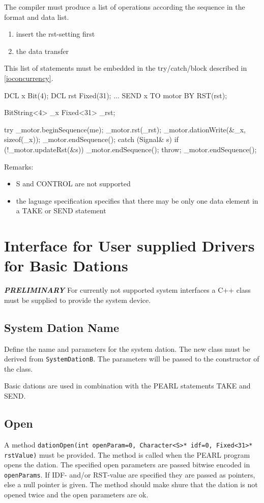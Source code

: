 The compiler must produce a list of operations according the sequence 
in the format and data list.
\begin{enumerate}
\item insert the rst-setting first
\item the data transfer 
\end{enumerate}
This list of statements must be embedded in the try/catch/block described in
\ref{ioconcurrency}.

\begin{PEARLCode}
DCL x Bit(4);
DCL rst Fixed(31);
...
SEND x TO motor BY RST(rst);
\end{PEARLCode}

\begin{CppCode}
BitString<4> _x
Fixed<31> _rst;

try {
   _motor.beginSequence(me);
   _motor.rst(_rst);
   _motor.dationWrite(&_x, sizeof(_x));
   _motor.endSequence();
} catch (Signal& s) {
   if (!_motor.updateRst(&s)) {
      _motor.endSequence();
      throw;
   }
   _motor.endSequence();
}
\end{CppCode}


Remarks:
\begin{itemize}
\item S and CONTROL are not supported
\item the laguage specification specifies that there
   may be only one data element in a TAKE or SEND statement
\end{itemize}

\section{Interface for User supplied Drivers for Basic Dations}
{\bf \it PRELIMINARY} For currently not supported system interfaces a C++ class must be supplied to 
provide the system device.

\subsection{System Dation Name}
Define the name and parameters for the system dation.
The new class must be derived from \verb|SystemDationB|.
The parameters will be passed to the constructor of the class.

Basic dations are used in combination with the PEARL statements TAKE and
SEND.

\subsection{Open}
A method \verb|dationOpen(int openParam=0, Character<S>* idf=0, Fixed<31>* rstValue)|
must be provided.
The method is called when the PEARL program opens the dation.
The specified open parameters are passed bitwise encoded in \verb|openParams|.
If IDF- and/or RST-value are specified they are passed as pointers, else
a null pointer is given.
The method should make shure that the dation is not opened twice and
the open parameters are ok.


